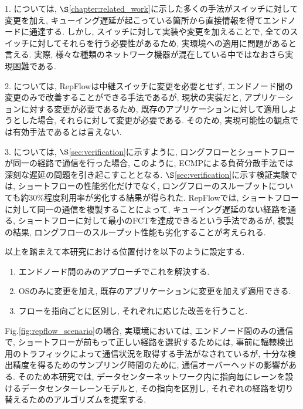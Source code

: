 1. については, $\S$\ref{chapter:related_work}に示した多くの手法がスイッチに対して変更を加え,
キューイング遅延が起こっている箇所から直接情報を得てエンドノードに通達する. 
しかし, スイッチに対して実装や変更を加えることで, 全てのスイッチに対してそれらを行う必要性があるため, 実環境への適用に問題があると言える. 
実際, 様々な種類のネットワーク機器が混在している中ではなおさら実現困難である\cite{d3}.

2. については, RepFlowは中継スイッチに変更を必要とせず, エンドノード間の変更のみで改善することができる手法であるが, 現状の実装だと,
アプリケーションに対する変更が必要であるため, 既存のアプリケーションに対して適用しようとした場合,
それらに対して変更が必要である\cite{repflow}.
そのため, 実現可能性の観点では有効手法であるとは言えない. 

3. については, $\S$\ref{sec:verification}に示すように, ロングフローとショートフローが同一の経路で通信を行った場合, 
このように, ECMPによる負荷分散手法では深刻な遅延の問題を引き起こすこととなる. 
$\S$\ref{sec:verification}に示す検証実験では, ショートフローの性能劣化だけでなく,
ロングフローのスループットについても約30\%程度利用率が劣化する結果が得られた. 
RepFlowでは, ショートフローに対して同一の通信を複製することによって, キューイング遅延のない経路を通る,
ショートフローに対して最小のFCTを達成できるという手法であるが, 複製の結果, ロングフローのスループット性能も劣化することが考えられる. 

以上を踏まえて本研究における位置付けを以下のように設定する. 
\begin{enumerate}
\item エンドノード間のみのアプローチでこれを解決する. 
\item OSのみに変更を加え, 既存のアプリケーションに変更を加えず適用できる. 
\item フローを指向ごとに区別し, それぞれに応じた改善を行うこと. 
\end{enumerate} 

Fig.\ref{fig:repflow_scenario}の場合, 実環境においては,
エンドノード間のみの通信で, ショートフローが前もって正しい経路を選択するためには,
事前に輻輳検出用のトラフィックによって通信状況を取得する手法がなされているが, 十分な検出精度を得るためのサンプリング時間のために,
通信オーバーヘッドの影響がある\cite{devoflow}.
そのため本研究では, データセンターネットワーク内に指向毎にレーンを設けるデータセンターレーンモデルと, その指向を区別し,
それぞれの経路を切り替えるためのアルゴリズムを提案する. 

